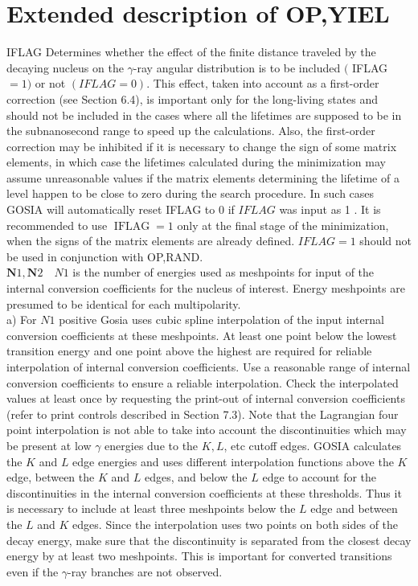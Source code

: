 \documentclass[10pt]{article}
\begin{document}
\section*{Extended description of OP,YIEL}
IFLAG Determines whether the effect of the finite distance traveled by the decaying nucleus on the $\gamma$-ray angular distribution is to be included $($ IFLAG $=1)$ or not $(I F L A G=0)$. This effect, taken into account as a first-order correction (see Section 6.4), is important only for the long-living states and should not be included in the cases where all the lifetimes are supposed to be in the subnanosecond range to speed up the calculations. Also, the first-order correction may be inhibited if it is necessary to change the sign of some matrix elements, in which case the lifetimes calculated during the minimization may assume unreasonable values if the matrix elements determining the lifetime of a level happen to be close to zero during the search procedure. In such cases GOSIA will automatically reset IFLAG to 0 if $I F L A G$ was input as 1 . It is recommended to use $\operatorname{IFLAG}=1$ only at the final stage of the minimization, when the signs of the matrix elements are already defined. $I F L A G=1$ should not be used in conjunction with OP,RAND.\\
$\mathbf{N} 1, \mathbf{N} 2 \quad N 1$ is the number of energies used as meshpoints for input of the internal conversion coefficients for the nucleus of interest. Energy meshpoints are presumed to be identical for each multipolarity.\\
a) For $N 1$ positive Gosia uses cubic spline interpolation of the input internal conversion coefficients at these meshpoints. At least one point below the lowest transition energy and one point above the highest are required for reliable interpolation of internal conversion coefficients. Use a reasonable range of internal conversion coefficients to ensure a reliable interpolation. Check the interpolated values at least once by requesting the print-out of internal conversion coefficients (refer to print controls described in Section 7.3). Note that the Lagrangian four point interpolation is not able to take into account the discontinuities which may be present at low $\gamma$ energies due to the $K, L$, etc cutoff edges. GOSIA calculates the $K$ and $L$ edge energies and uses different interpolation functions above the $K$ edge, between the $K$ and $L$ edges, and below the $L$ edge to account for the discontinuities in the internal conversion coefficients at these thresholds. Thus it is necessary to include at least three meshpoints below the $L$ edge and between the $L$ and $K$ edges. Since the interpolation uses two points on both sides of the decay energy, make sure that the discontinuity is separated from the closest decay energy by at least two meshpoints. This is important for converted transitions even if the $\gamma$-ray branches are not observed.\\
\end{document}
